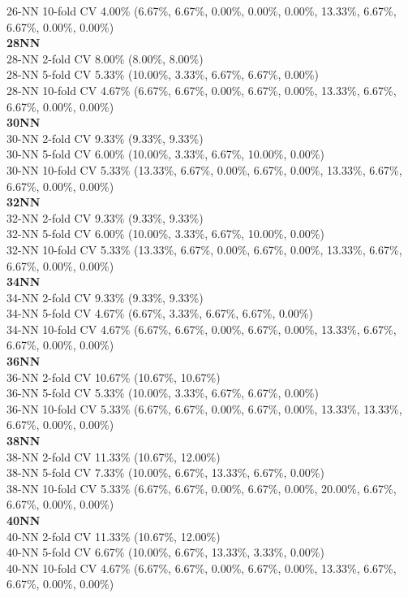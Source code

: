 \documentclass[11pt,a4paper]{article}
\begin{document}
26-NN 10-fold CV  4.00\%  (6.67\%, 6.67\%, 0.00\%, 0.00\%, 0.00\%, 13.33\%, 6.67\%, 6.67\%, 0.00\%, 0.00\%)\\  
\textbf{28NN }\\
28-NN 2-fold CV  8.00\%  (8.00\%, 8.00\%)\\  
28-NN 5-fold CV  5.33\%  (10.00\%, 3.33\%, 6.67\%, 6.67\%, 0.00\%)\\  
28-NN 10-fold CV  4.67\%  (6.67\%, 6.67\%, 0.00\%, 6.67\%, 0.00\%, 13.33\%, 6.67\%, 6.67\%, 0.00\%, 0.00\%)\\  
\textbf{30NN }\\
30-NN 2-fold CV  9.33\%  (9.33\%, 9.33\%)\\  
30-NN 5-fold CV  6.00\%  (10.00\%, 3.33\%, 6.67\%, 10.00\%, 0.00\%)\\  
30-NN 10-fold CV  5.33\%  (13.33\%, 6.67\%, 0.00\%, 6.67\%, 0.00\%, 13.33\%, 6.67\%, 6.67\%, 0.00\%, 0.00\%)\\  
\textbf{32NN }\\
32-NN 2-fold CV  9.33\%  (9.33\%, 9.33\%)\\  
32-NN 5-fold CV  6.00\%  (10.00\%, 3.33\%, 6.67\%, 10.00\%, 0.00\%)\\  
32-NN 10-fold CV  5.33\%  (13.33\%, 6.67\%, 0.00\%, 6.67\%, 0.00\%, 13.33\%, 6.67\%, 6.67\%, 0.00\%, 0.00\%)\\  
\textbf{34NN }\\
34-NN 2-fold CV  9.33\%  (9.33\%, 9.33\%)\\  
34-NN 5-fold CV  4.67\%  (6.67\%, 3.33\%, 6.67\%, 6.67\%, 0.00\%)\\  
34-NN 10-fold CV  4.67\%  (6.67\%, 6.67\%, 0.00\%, 6.67\%, 0.00\%, 13.33\%, 6.67\%, 6.67\%, 0.00\%, 0.00\%)\\  
\textbf{36NN }\\
36-NN 2-fold CV  10.67\%  (10.67\%, 10.67\%)\\  
36-NN 5-fold CV  5.33\%  (10.00\%, 3.33\%, 6.67\%, 6.67\%, 0.00\%)\\  
36-NN 10-fold CV  5.33\%  (6.67\%, 6.67\%, 0.00\%, 6.67\%, 0.00\%, 13.33\%, 13.33\%, 6.67\%, 0.00\%, 0.00\%)\\  
\textbf{38NN }\\
38-NN 2-fold CV  11.33\%  (10.67\%, 12.00\%)\\  
38-NN 5-fold CV  7.33\%  (10.00\%, 6.67\%, 13.33\%, 6.67\%, 0.00\%)\\  
38-NN 10-fold CV  5.33\%  (6.67\%, 6.67\%, 0.00\%, 6.67\%, 0.00\%, 20.00\%, 6.67\%, 6.67\%, 0.00\%, 0.00\%) \\
\textbf{40NN }\\
40-NN 2-fold CV   11.33\%   (10.67\%, 12.00\%)\\ 
40-NN 5-fold CV   6.67\%   (10.00\%, 6.67\%, 13.33\%, 3.33\%, 0.00\%)\\ 
40-NN 10-fold CV   4.67\%   (6.67\%, 6.67\%, 0.00\%, 6.67\%, 0.00\%, 13.33\%, 6.67\%, 6.67\%, 0.00\%, 0.00\%)\\
\newpage
\end{document}
